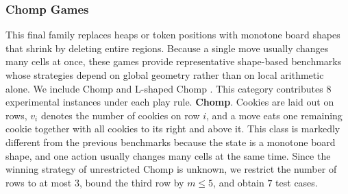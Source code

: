 \documentclass[review]{elsarticle}
\newcommand{\set}[1]{\{ #1 \}}
\newcommand{\tuple}[1]{\langle {#1} \rangle}
\newcommand{\true}{\top}
\newcommand{\statevar}{\mathcal{X}}
\newcommand{\act}{\mathcal{A}}
\newcommand{\constraint}{\mathcal{C}}
\newcommand{\estate}{\mathcal{E}}
\newcommand{\pre}{\mathtt{pre}}
\newcommand{\eff}{\mathtt{eff}}
\begin{document}
{\color{red}\subsubsection{Chomp Games}}
{\color{red}This final family replaces heaps or token positions with monotone board shapes that shrink by deleting entire regions.}
{\color{red}Because a single move usually changes many cells at once, these games provide representative shape-based benchmarks whose strategies depend on global geometry rather than on local arithmetic alone.}
{\color{red}We include Chomp \cite{Sch1952} and L-shaped Chomp \cite{Sch1952}.}
{\color{red}This category contributes $8$ experimental instances under each play rule.}
{\color{red}\textbf{Chomp}. Cookies are laid out on rows, $v_i$ denotes the number of cookies on row $i$, and a move eats one remaining cookie together with all cookies to its right and above it.}
{\color{red}This class is markedly different from the previous benchmarks because the state is a monotone board shape, and one action usually changes many cells at the same time.}
{\color{red}Since the winning strategy of unrestricted Chomp is unknown, we restrict the number of rows to at most $3$, bound the third row by $m \le 5$, and obtain $7$ test cases.}
\end{document}
